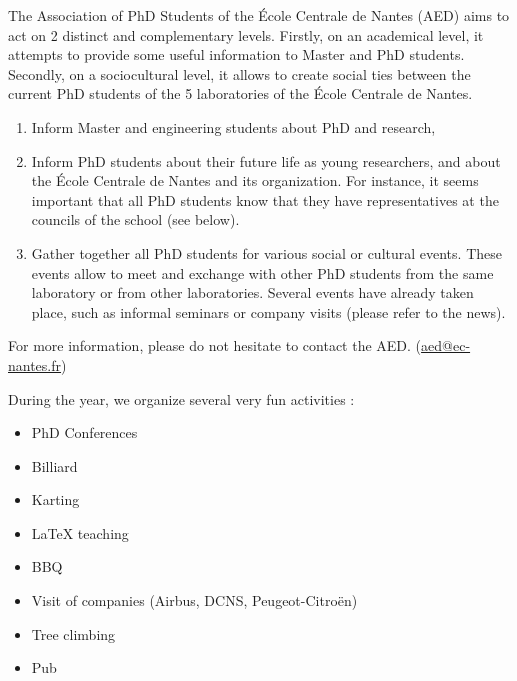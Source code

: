 \documentclass[11pt]{report}
\begin{document}
The Association of PhD Students of the École Centrale de Nantes (AED) aims to act on 2 distinct and complementary levels. Firstly, on an academical level, it attempts to provide some useful information to Master and PhD students. Secondly, on a sociocultural level, it allows to create social ties between the current PhD students of the 5 laboratories of the École Centrale de Nantes.

\begin{enumerate}
    \item Inform Master and engineering students about PhD and research,
    \item Inform PhD students about their future life as young researchers, and about the École Centrale de Nantes and its organization. For instance, it seems important that all PhD students know that they have representatives at the councils of the school (see below).
    \item Gather together all PhD students for various social or cultural events. These events allow to meet and exchange with other PhD students from the same laboratory or from other laboratories. Several events have already taken place, such as informal seminars or company visits (please refer to the news).
\end{enumerate}

For more information, please do not hesitate to contact the AED. (\url{aed@ec-nantes.fr})


During the year, we organize several very fun activities :
\begin{itemize}
    \item PhD Conferences
    \item Billiard
    \item Karting
    \item \LaTeX{} teaching
    \item BBQ
    \item Visit of companies (Airbus, DCNS, Peugeot-Citroën)
    \item Tree climbing
    \item Pub
\end{itemize}



%


\end{document}
